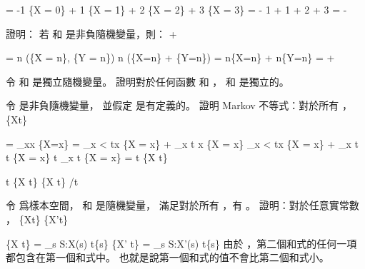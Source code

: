 \startformula\startmathalignment
\NC \E[X] \NC = -1 \cdot \Pr\{X = 0\} +
             1 \cdot \Pr\{X = 1\} +
             2 \cdot \Pr\{X = 2\} +
             3 \cdot \Pr\{X = 3\} \NR
\NC \NC = - 1 \cdot {}
            + 1 \cdot {}
            + 2 \cdot {}
            + 3 \cdot {} \NR
\NC \NC = -  \NR
\NC \NC {} \NR
\stopmathalignment\stopformula
\stopANSWER

\startEXERCISE
證明：
若  和  是非負隨機變量，則：
\startformula
\E[\max(X,Y)] \le \E[X] + \E[Y]
\stopformula
\stopEXERCISE

\startANSWER
\startformula\startmathalignment
\NC \E[\max(X, Y)] \NC = \sum n \cdot \max(\Pr\{X = n\}, \Pr\{Y = n\}) \NR
\NC \NC \le \sum n \cdot (\Pr\{X=n\} + \Pr\{Y=n\}) \NR
\NC \NC = \sum n\cdot \Pr\{X=n\} + \sum n\cdot \Pr\{Y=n\} \NR
\NC \NC = \E[X] + \E[Y] \NR
\stopmathalignment\stopformula
\stopANSWER

\startEXERCISE\DIFFICULT
令  和  是獨立隨機變量。
證明對於任何函數  和 ，
  和  是獨立的。
\stopEXERCISE

\startANSWER
{}
\stopANSWER

\startEXERCISE\DIFFICULT
令  是非負隨機變量，
並假定 \m{\E[X]} 是有定義的。
證明 {\EMP Markov 不等式}：對於所有 ，
\startformula
\Pr\{X\ge t\}\le {} 
\stopformula
\stopEXERCISE

\startANSWER
\startformula\startmathalignment
\NC \E[X] \NC = \sum_{x}x \cdot \Pr\{X=x\} \NR
\NC \NC = \sum_{x < t}x \cdot \Pr\{X = x\} + \sum_{x \ge t} x \cdot \Pr\{X = x\} \NR
\NC \NC \ge \sum_{x < t}x \cdot \Pr\{X = x\} + \sum_{x \ge t} t \cdot \Pr\{X = x\} \NR
\NC \NC \ge t \sum_{x \ge t} \Pr\{X = x\} \NR
\NC \NC = t \cdot \Pr\{X \ge t\} \NR
\stopmathalignment\stopformula

\startformula\startmathalignment[n=1]
\NC \E[X] \ge t \cdot \Pr\{X \ge t\} \NR
\NC \Downarrow \NR
\NC \Pr\{X \ge t\} \le \E[X]/t \NR
\stopmathalignment\stopformula
\stopANSWER

\startEXERCISE\DIFFICULT
令  爲樣本空間，  和  是隨機變量，
滿足對於所有 ，有 。
證明：對於任意實常數 ，
\startformula
\Pr\{X\ge t\} \ge \Pr\{X'\ge t\}
\stopformula
\stopEXERCISE

\startANSWER
\startformula\startmathalignment
\NC \Pr\{X \ge t\} \NC = \sum_{s \in S:X(s) \ge t}\Pr\{s\} \NR
\NC \Pr\{X' \ge t\} \NC = \sum_{s \in S:X'(s) \ge t}\Pr\{s\} \NR
\stopmathalignment\stopformula
由於 ，第二個和式的任何一項都包含在第一個和式中。
也就是說第一個和式的值不會比第二個和式小。
\stopANSWER


